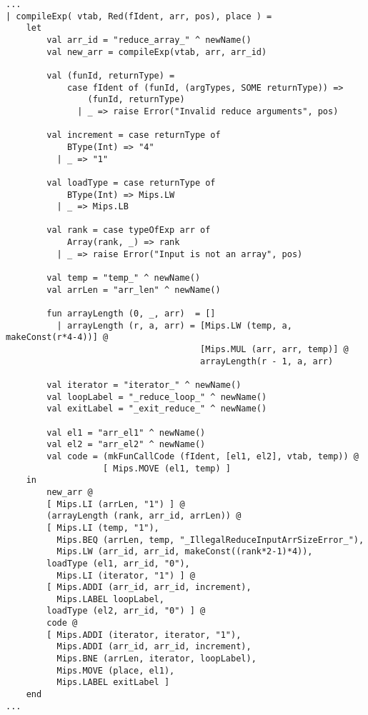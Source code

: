 \documentclass[12pt]{article}
\begin{document}
\begin{lstlisting}[caption=Extend Compiler.sml to support reduce.]
...
| compileExp( vtab, Red(fIdent, arr, pos), place ) =
    let 
        val arr_id = "reduce_array_" ^ newName()
        val new_arr = compileExp(vtab, arr, arr_id)

        val (funId, returnType) =
            case fIdent of (funId, (argTypes, SOME returnType)) =>
                (funId, returnType)
              | _ => raise Error("Invalid reduce arguments", pos)

        val increment = case returnType of 
            BType(Int) => "4"
          | _ => "1"

        val loadType = case returnType of 
            BType(Int) => Mips.LW
          | _ => Mips.LB
            
        val rank = case typeOfExp arr of 
            Array(rank, _) => rank
          | _ => raise Error("Input is not an array", pos)

        val temp = "temp_" ^ newName()
        val arrLen = "arr_len" ^ newName()

        fun arrayLength (0, _, arr)  = []
          | arrayLength (r, a, arr) = [Mips.LW (temp, a, makeConst(r*4-4))] @
                                      [Mips.MUL (arr, arr, temp)] @
                                      arrayLength(r - 1, a, arr)

        val iterator = "iterator_" ^ newName()
        val loopLabel = "_reduce_loop_" ^ newName()
        val exitLabel = "_exit_reduce_" ^ newName()

        val el1 = "arr_el1" ^ newName()
        val el2 = "arr_el2" ^ newName()
        val code = (mkFunCallCode (fIdent, [el1, el2], vtab, temp)) @
                   [ Mips.MOVE (el1, temp) ]
    in
        new_arr @
        [ Mips.LI (arrLen, "1") ] @
        (arrayLength (rank, arr_id, arrLen)) @
        [ Mips.LI (temp, "1"),
          Mips.BEQ (arrLen, temp, "_IllegalReduceInputArrSizeError_"),
          Mips.LW (arr_id, arr_id, makeConst((rank*2-1)*4)),
        loadType (el1, arr_id, "0"),
          Mips.LI (iterator, "1") ] @
        [ Mips.ADDI (arr_id, arr_id, increment),
          Mips.LABEL loopLabel,
        loadType (el2, arr_id, "0") ] @
        code @
        [ Mips.ADDI (iterator, iterator, "1"),
          Mips.ADDI (arr_id, arr_id, increment),
          Mips.BNE (arrLen, iterator, loopLabel),
          Mips.MOVE (place, el1),
          Mips.LABEL exitLabel ]
    end
...
\end{lstlisting}
\end{document}
